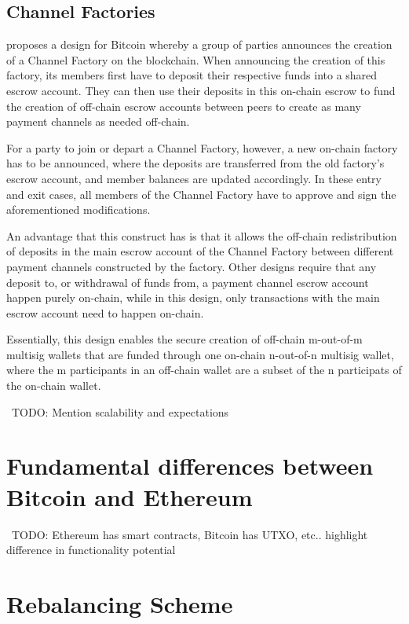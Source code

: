 \documentclass[12pt]{article}
\newcommand{\todo}[1]{{\color{red}\ TODO: {#1}}}
\begin{document}
\subsection{Channel Factories}
\cite{scale} proposes a design for Bitcoin whereby a group of parties announces the creation of a Channel Factory on the blockchain. When announcing the creation of this factory, its members first have to deposit their respective funds into a shared escrow account. They can then use their deposits in this on-chain escrow to fund the creation of off-chain escrow accounts between peers to create as many payment channels as needed off-chain.

For a party to join or depart a Channel Factory, however, a new on-chain factory has to be announced, where the deposits are transferred from the old factory's escrow account, and member balances are updated accordingly. In these entry and exit cases, all members of the Channel Factory have to approve and sign the aforementioned modifications.

An advantage that this construct has is that it allows the off-chain redistribution of deposits in the main escrow account of the Channel Factory between different payment channels constructed by the factory. Other designs require that any deposit to, or withdrawal of funds from, a payment channel escrow account happen purely on-chain, while in this design, only transactions with the main escrow account need to happen on-chain.

Essentially, this design enables the secure creation of off-chain m-out-of-m multisig wallets that are funded through one on-chain n-out-of-n multisig wallet, where the m participants in an off-chain wallet are a subset of the n participats of the on-chain wallet.

\todo{Mention scalability and expectations}

\section{Fundamental differences between Bitcoin and Ethereum}
\todo{Ethereum has smart contracts, Bitcoin has UTXO, etc.. highlight difference in functionality potential}

\section{Rebalancing Scheme}
\end{document}
